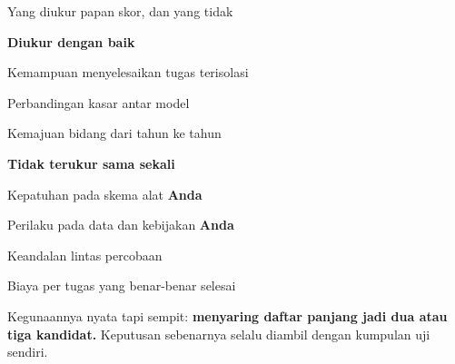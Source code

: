 \documentclass[aspectratio=169,11pt,t]{beamer}
\begin{document}
\begin{frame}[shrink=25]{Yang diukur papan skor, dan yang tidak}
\begin{minipage}[t]{0.485\textwidth}
{\fontsize{9.4}{12.6}\selectfont\color{fg2}\textbf{Diukur dengan baik}\par}\vskip 4pt
\begin{ibullets}
\item Kemampuan menyelesaikan tugas terisolasi
\item Perbandingan kasar antar model
\item Kemajuan bidang dari tahun ke tahun
\end{ibullets}

\end{minipage}%
\hfill
\begin{minipage}[t]{0.485\textwidth}
{\fontsize{9.4}{12.6}\selectfont\color{fg2}\textbf{Tidak terukur sama sekali}\par}\vskip 4pt
\begin{ibullets}
\item Kepatuhan pada skema alat \textbf{Anda}
\item Perilaku pada data dan kebijakan \textbf{Anda}
\item Keandalan lintas percobaan
\item Biaya per tugas yang benar-benar selesai
\end{ibullets}

\end{minipage}%
\begin{iband}[signal]
Kegunaannya nyata tapi sempit: \textbf{menyaring daftar panjang jadi dua atau tiga kandidat.} Keputusan sebenarnya selalu diambil dengan kumpulan uji sendiri.
\end{iband}
\end{frame}
\end{document}
